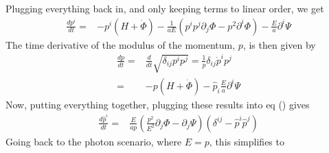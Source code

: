 Plugging everything back in, and only keeping terms to linear order, we get
\begin{equation}
	\begin{split}
		\frac{dp^i}{dt} %
		=& -p^i(H+\dot\Phi)- \frac{1}{aE}\left(p^ip^j\partial_j\Phi - p^2\partial^i\Phi\right) -\frac{E}{a}\partial^i\Psi
	\end{split}
\end{equation}
The time derivative of the modulus of the momentum, $p$, is then given by
\begin{equation}
	\begin{split}
		\frac{dp}{dt} =& \frac{d}{dt}\sqrt{\delta_{ij}p^ip^j} = \frac{1}{p}\delta_{ij}\dot p^i p^j \\
		=& -p(H+\dot\Phi) - \hat{p}_i\frac{E}{a}\partial^i\Psi
	\end{split}
\end{equation}
Now, putting everything together, plugging these results into eq () gives
\begin{equation}
	\begin{split}
		\frac{d\hat{p}^i}{dt} %
		=&  \frac{E}{ap}\left( \frac{p^2}{E^2}\partial_j\Phi - \partial_j\Psi \right)(\delta^{ij}-\hat{p}^i\hat{p}^j)
	\end{split}
\end{equation} 
Going back to the photon scenario, where $E=p$, this simplifies to
